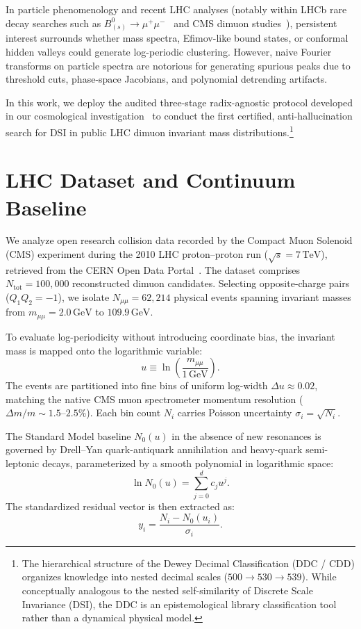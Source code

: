 \documentclass[11pt,a4paper]{article}
\begin{document}
In particle phenomenology and recent LHC analyses (notably within LHCb rare decay searches such as $B_{(s)}^0 \to \mu^+\mu^-$~\cite{lhcbrun2} and CMS dimuon studies~\cite{cmsopendata2010}), persistent interest surrounds whether mass spectra, Efimov-like bound states, or conformal hidden valleys could generate log-periodic clustering. However, naive Fourier transforms on particle spectra are notorious for generating spurious peaks due to threshold cuts, phase-space Jacobians, and polynomial detrending artifacts.

In this work, we deploy the audited three-stage radix-agnostic protocol developed in our cosmological investigation~\cite{olivaes2026planck} to conduct the first certified, anti-hallucination search for DSI in public LHC dimuon invariant mass distributions.\footnote{The hierarchical structure of the Dewey Decimal Classification (DDC / CDD) organizes knowledge into nested decimal scales ($500 \to 530 \to 539$). While conceptually analogous to the nested self-similarity of Discrete Scale Invariance (DSI), the DDC is an epistemological library classification tool rather than a dynamical physical model.}

\section{LHC Dataset and Continuum Baseline}
We analyze open research collision data recorded by the Compact Muon Solenoid (CMS) experiment during the 2010 LHC proton--proton run ($\sqrt{s} = 7\,\text{TeV}$), retrieved from the CERN Open Data Portal~\cite{cmsopendata2010}. The dataset comprises $N_{\text{tot}} = 100,000$ reconstructed dimuon candidates. Selecting opposite-charge pairs ($Q_1 Q_2 = -1$), we isolate $N_{\mu\mu} = 62,214$ physical events spanning invariant masses from $m_{\mu\mu} = 2.0\,\text{GeV}$ to $109.9\,\text{GeV}$.

To evaluate log-periodicity without introducing coordinate bias, the invariant mass is mapped onto the logarithmic variable:
\begin{equation}
u \equiv \ln\left(\frac{m_{\mu\mu}}{1\,\text{GeV}}\right).
\end{equation}
The events are partitioned into fine bins of uniform log-width $\Delta u \approx 0.02$, matching the native CMS muon spectrometer momentum resolution ($\Delta m / m \sim 1.5\text{--}2.5\%$). Each bin count $N_i$ carries Poisson uncertainty $\sigma_i = \sqrt{N_i}$.

The Standard Model baseline $N_0(u)$ in the absence of new resonances is governed by Drell--Yan quark-antiquark annihilation and heavy-quark semi-leptonic decays, parameterized by a smooth polynomial in logarithmic space:
\begin{equation}
\ln N_0(u) = \sum_{j=0}^{d} c_j u^j.
\end{equation}
The standardized residual vector is then extracted as:
\begin{equation}
y_i = \frac{N_i - N_0(u_i)}{\sigma_i}.
\end{equation}
\end{document}
